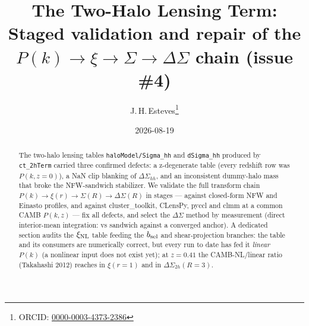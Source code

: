 \documentclass[a4paper, 11pt]{article}
\title{\vspace{-4ex}\huge \textbf{The Two-Halo Lensing Term:}\\[0.5ex]
       \Large \textbf{Staged validation and repair of the
       $P(k)\!\to\!\xi\!\to\!\Sigma\!\to\!\Delta\Sigma$ chain (issue \#4)}}
\author{J.\,H.\,Esteves\thanks{ORCID:
  \href{https://orcid.org/0000-0003-4373-2386}{0000-0003-4373-2386}}}
\date{2026-08-19}
\newcommand{\modname}[1]{\textcolor{kwcol}{\texttt{#1}}}
\newcommand{\blk}[1]{\textcolor{datablockcol}{\texttt{#1}}}
\newcommand{\xinl}{\xi_{\rm NL}}
\newcommand{\DShh}{\Delta\Sigma_{hh}}
\newcommand{\DStwo}{\Delta\Sigma_{2h}}
\newcommand{\bsel}{b_{\rm sel}}
\begin{document}
\maketitle

\begin{abstract}
The two-halo lensing tables \blk{haloModel/Sigma\_hh} and
\blk{dSigma\_hh} produced by
\modname{ct\_2hTerm} carried three confirmed defects: a z-degenerate
table (every redshift row was $P(k, z{=}0)$), a NaN clip blanking
\nanFracBefore{} of $\DShh$, and an inconsistent dummy-halo mass that
broke the NFW-sandwich stabilizer. We validate the full transform chain
$P(k)\to\xi(r)\to\Sigma(R)\to\Delta\Sigma(R)$ in stages --- against
closed-form NFW and Einasto profiles, and against cluster\_toolkit,
CLensPy, pyccl and clmm at a common CAMB $P(k,z)$ --- fix all defects,
and select the $\Delta\Sigma$ method by measurement
(direct interior-mean integration: \dDirect{} vs sandwich \dSand{}
against a converged anchor). A dedicated section audits the
$\xinl$ table feeding the $\bsel$ and shear-projection branches: the
table and its consumers are numerically correct, but every run to date
has fed it \emph{linear} $P(k)$ (a nonlinear input does not exist
yet); at $z=0.41$ the CAMB-NL/linear ratio (Takahashi 2012) reaches \xiNlLinRatioROne{} in $\xi(r{=}1)$
and \dsNlLinRatioRThree{} in $\DStwo(R{=}3)$.
\end{abstract}

\tableofcontents










\end{document}
